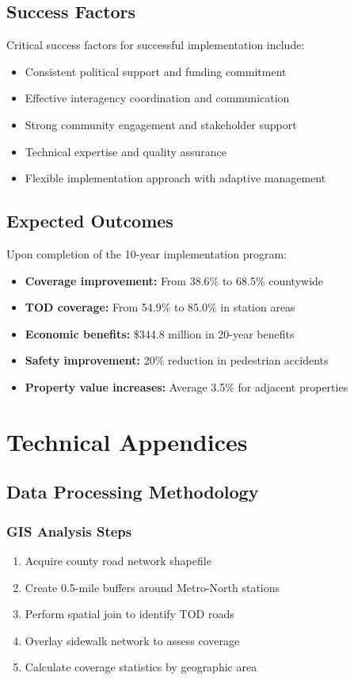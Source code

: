 \documentclass[11pt,letterpaper]{report}
\begin{document}
\section{Success Factors}

Critical success factors for successful implementation include:
\begin{itemize}
    \item Consistent political support and funding commitment
    \item Effective interagency coordination and communication
    \item Strong community engagement and stakeholder support
    \item Technical expertise and quality assurance
    \item Flexible implementation approach with adaptive management
\end{itemize}

\section{Expected Outcomes}

Upon completion of the 10-year implementation program:
\begin{itemize}
    \item \textbf{Coverage improvement:} From 38.6\% to 68.5\% countywide
    \item \textbf{TOD coverage:} From 54.9\% to 85.0\% in station areas
    \item \textbf{Economic benefits:} \$344.8 million in 20-year benefits
    \item \textbf{Safety improvement:} 20\% reduction in pedestrian accidents
    \item \textbf{Property value increases:} Average 3.5\% for adjacent properties
\end{itemize}

\appendix

\chapter{Technical Appendices}

\section{Data Processing Methodology}

\subsection{GIS Analysis Steps}
\begin{enumerate}
    \item Acquire county road network shapefile
    \item Create 0.5-mile buffers around Metro-North stations
    \item Perform spatial join to identify TOD roads
    \item Overlay sidewalk network to assess coverage
    \item Calculate coverage statistics by geographic area
\end{enumerate}
\end{document}
